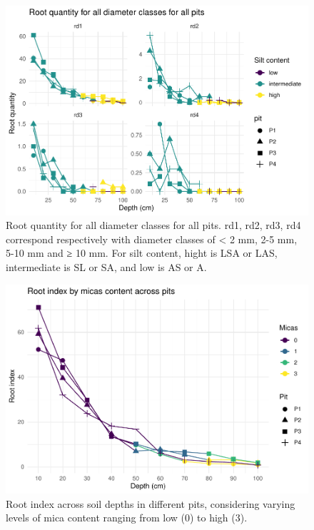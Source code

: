 \documentclass[fleqn,12pt]{latex/stylish_article} %
\begin{document}
\normalsize



\scriptsize

\begin{figure}

{\centering \includegraphics[width=0.8\linewidth]{pedoP16-report_files/figure-latex/pitPlotdiameterClassDistinct-1} 

}

\caption{Root quantity for all diameter classes for all pits. rd1, rd2, rd3, rd4 correspond respectively with diameter classes of \textless{} 2 mm, 2-5 mm, 5-10 mm and ≥ 10 mm. For silt content, hight is LSA or LAS, intermediate is SL or SA, and low is AS or A.}\label{fig:pitPlotdiameterClassDistinct}
\end{figure}

\normalsize



\scriptsize

\begin{figure}

{\centering \includegraphics[width=0.8\linewidth]{pedoP16-report_files/figure-latex/pitPlotrootIndexMicas-1} 

}

\caption{Root index across soil depths in different pits, considering varying levels of mica content ranging from low (0) to high (3).}\label{fig:pitPlotrootIndexMicas}
\end{figure}
\end{document}
